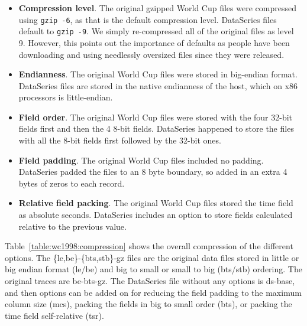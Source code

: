 \begin{itemize}

\item {\bf Compression level}.  The original gzipped World Cup files were
compressed using {\tt gzip -6}, as that is the default compression
level.  DataSeries files default to {\tt gzip -9}.  We simply
re-compressed all of the original files as level 9.  However, this
points out the importance of defaults as people have been downloading
and using needlessly oversized files since they were released.

\item {\bf Endianness}.  The original World Cup files were stored
in big-endian format.  DataSeries files are stored in the native
endianness of the host, which on x86 processors is little-endian.

\item {\bf Field order}.  The original World Cup files were stored
with the four 32-bit fields first and then the 4 8-bit fields.
DataSeries happened to store the files with all the 8-bit fields first
followed by the 32-bit ones.

\item {\bf Field padding}.  The original World Cup files included
no padding.  DataSeries padded the files to an 8 byte boundary, so
added in an extra 4 bytes of zeros to each record.

\item {\bf Relative field packing}.  The original World Cup files stored
the time field as absolute seconds.  DataSeries includes an option to
store fields calculated relative to the previous value.

\end{itemize}

Table~\ref{table:wc1998:compression} shows the overall compression of
the different options.  The \{le,be\}-\{bts,stb\}-gz files are the
original data files stored in little or big endian format (le/be) and
big to small or small to big (bts/stb) ordering.  The original traces
are be-bts-gz.  The DataSeries file without any options is ds-base,
and then options can be added on for reducing the field padding to the
maximum column size (mcs), packing the fields in big to small order
(bts), or packing the time field self-relative (tsr).


